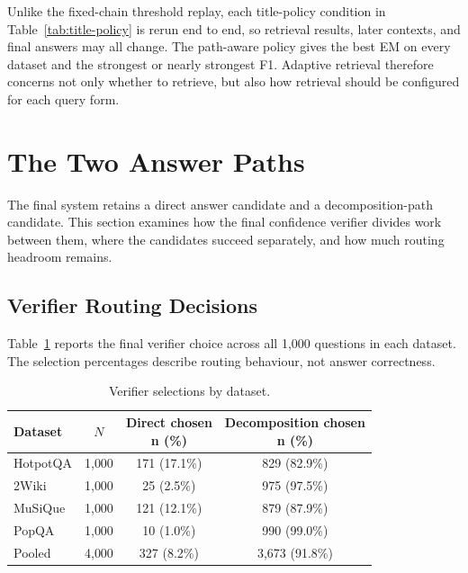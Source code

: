 \documentclass{nthu_thesis}
\begin{document}
\begin{thesiscjk}
Unlike the fixed-chain threshold replay, each title-policy condition in Table~\ref{tab:title-policy} is rerun end to end, so retrieval results, later contexts, and final answers may all change. The path-aware policy gives the best EM on every dataset and the strongest or nearly strongest F1. Adaptive retrieval therefore concerns not only whether to retrieve, but also how retrieval should be configured for each query form.

\section{The Two Answer Paths}
\label{sec:path-analysis}

The final system retains a direct answer candidate and a decomposition-path candidate. This section examines how the final confidence verifier divides work between them, where the candidates succeed separately, and how much routing headroom remains.

\subsection{Verifier Routing Decisions}
\label{sec:path-selection-rate}

Table~\ref{tab:path-selection-rate} reports the final verifier choice across all 1{,}000 questions in each dataset. The selection percentages describe routing behaviour, not answer correctness.

\begin{table}[h]
    \centering
    \caption[Verifier Routing Decisions]{Verifier selections by dataset.}
    \label{tab:path-selection-rate}
    \setlength{\tabcolsep}{6pt}
    \small
    \begin{tabular}{ l c c c }
        \toprule
        Dataset & $N$ & \shortstack{Direct chosen\\n (\%)} & \shortstack{Decomposition chosen\\n (\%)} \\
        \midrule
        HotpotQA & 1{,}000 & 171 (17.1\%) & 829 (82.9\%) \\
        2Wiki & 1{,}000 & 25 (2.5\%) & 975 (97.5\%) \\
        MuSiQue & 1{,}000 & 121 (12.1\%) & 879 (87.9\%) \\
        PopQA & 1{,}000 & 10 (1.0\%) & 990 (99.0\%) \\
        \midrule
        Pooled & 4{,}000 & 327 (8.2\%) & 3{,}673 (91.8\%) \\
        \bottomrule
    \end{tabular}
\end{table}


\end{thesiscjk}
\end{document}
